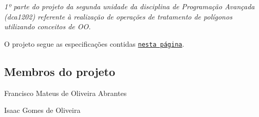 {\itshape 1º parte do projeto da segunda unidade da disciplina de Programação Avançada (dca1202) referente à realização de operações de tratamento de polígonos utilizando conceitos de OO.}


\begin{DoxyItemize}
\item O projeto segue as especificações contidas \href{http://agostinhobritojr.github.io/cursos/progav/projetoscpp.html#_projeto_1_tratamento_de_pol%C3%ADgonos}{\tt nesta página}.
\end{DoxyItemize}

\subsection*{Membros do projeto}


\begin{DoxyItemize}
\item Francisco Mateus de Oliveira Abrantes
\item Isaac Gomes de Oliveira 
\end{DoxyItemize}